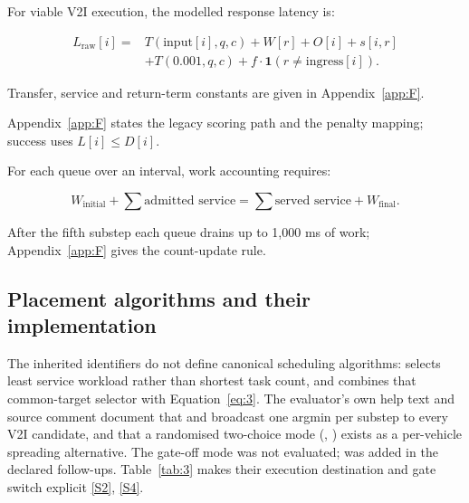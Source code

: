 \documentclass[12pt,a4paper]{article}
\begin{document}
For viable V2I execution, the modelled response latency is:

\begin{equation}\label{eq:4}
 \begin{aligned}
 L_{\mathrm{raw}}[i]={}&T(\mathrm{input}[i],q,c)+W[r]+O[i]+s[i,r]\\
 &+T(0.001,q,c)+f\cdot\mathbf{1}(r\neq\mathrm{ingress}[i]).
 \end{aligned}
\end{equation}

Transfer, service and return-term constants are given in Appendix~\ref{app:F}.

Appendix~\ref{app:F} states the legacy  scoring path and the penalty mapping; success uses $L[i]\leq D[i]$.

For each queue over an interval, work accounting requires:

\begin{equation}\label{eq:5}
 W_{\mathrm{initial}}+\sum\text{admitted service}
 =\sum\text{served service}+W_{\mathrm{final}}.
\end{equation}

After the fifth substep each queue drains up to 1,000 ms of work; Appendix~\ref{app:F} gives the count-update rule.

\FloatBarrier
\subsection{Placement algorithms and their implementation}\label{sec:2.5}

The inherited identifiers do not define canonical scheduling algorithms:  selects least service workload rather than shortest task count, and  combines that common-target selector with Equation~\eqref{eq:3}. The evaluator's own help text and source comment document that  and  broadcast one argmin per substep to every V2I candidate, and that a randomised two-choice mode (, ) exists as a per-vehicle spreading alternative. The gate-off  mode was not evaluated;  was added in the declared follow-ups. Table~\ref{tab:3} makes their execution destination and gate switch explicit \hyperref[source-s2]{[S2]}, \hyperref[source-s4]{[S4]}.
\end{document}
